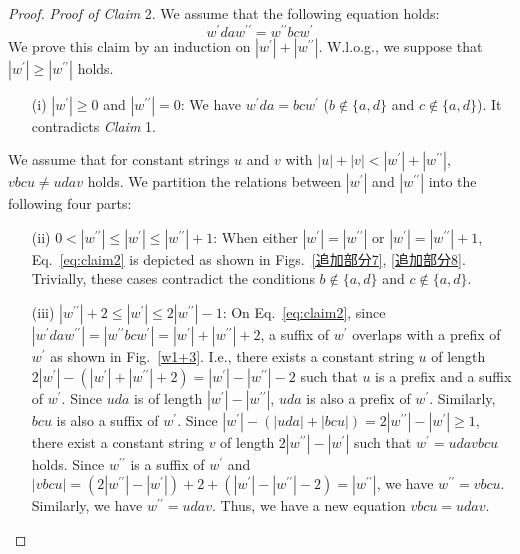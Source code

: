\begin{proof}
  \noindent
  \textit{Proof of Claim} 2.
  We assume that the following equation holds:
  \begin{equation}
  w^{\prime}daw^{\prime\prime} = w^{\prime\prime}bcw^{\prime}\label{eq:claim2}
  \end{equation}
  We prove this claim by an induction on $|w^{\prime}| + |w^{\prime\prime}|$.
  W.l.o.g., we suppose that $|w^{\prime}| \geq |w^{\prime\prime}|$ holds.
  \begin{enumerate}
    \item[(i)] $|w^{\prime}| \geq 0$ and $|w^{\prime\prime}|=0$:
    We have $w^{\prime}da = bcw^{\prime}$ ($b \not\in \{a,d\}$ and $c \not\in \{a,d\}$).
    It contradicts \textit{Claim} 1.
  \end{enumerate}
  We assume that for constant strings $u$ and $v$ with $|u| + |v| < |w^{\prime}| + |w^{\prime\prime}|$, $vbcu \not= udav$ holds.
  We partition the relations between $|w^{\prime}|$ and $|w^{\prime\prime}|$ into the following four parts:
  \begin{enumerate}
  \item[(ii)] $0 < |w^{\prime\prime}| \le |w^{\prime}| \le |w^{\prime\prime}|+1$:
  When either $|w^{\prime}|=|w^{\prime\prime}|$ or $|w^{\prime}|=|w^{\prime\prime}|+1$, Eq.~\ref{eq:claim2} is depicted as shown in Figs.~\ref{追加部分7}, \ref{追加部分8}. Trivially, these cases contradict the conditions $b \not\in \{a,d\}$ and $c \not\in \{a,d\}$.
  \item[(iii)] $|w^{\prime\prime}|+2 \le |w^{\prime}| \le 2|w^{\prime\prime}| - 1$:
  On Eq.~\ref{eq:claim2}, since $|w^{\prime}daw^{\prime\prime}| = |w^{\prime\prime}bcw^{\prime}| = |w^{\prime}| + |w^{\prime\prime}| + 2$, a suffix of $w^{\prime}$ overlaps with a prefix of $w^{\prime}$ as shown in Fig.~\ref{w1+3}. I.e., there exists a constant string $u$ of length $2|w^{\prime}| - (|w^{\prime}| + |w^{\prime\prime}| + 2) = |w^{\prime}| - |w^{\prime\prime}| - 2$ such that $u$ is a prefix and a suffix of $w^{\prime}$.
  Since $uda$ is of length $|w^{\prime}| - |w^{\prime\prime}|$, $uda$ is also a prefix of $w^{\prime}$. Similarly, $bcu$ is also a suffix of $w^{\prime}$.
  Since $|w^{\prime}| - (|uda| + |bcu|) = 2|w^{\prime\prime}| - |w^{\prime}| \ge 1$, there exist a constant string $v$ of length $2|w^{\prime\prime}| - |w^{\prime}|$ such that $w^{\prime} = udavbcu$ holds. Since $w^{\prime\prime}$ is a suffix of $w^{\prime}$ and $|vbcu| = (2|w^{\prime\prime}| - |w^{\prime}|) + 2 + (|w^{\prime}| - |w^{\prime\prime}| - 2) = |w^{\prime\prime}|$, we have $w^{\prime\prime} = vbcu$. Similarly, we have $w^{\prime\prime} = udav$. Thus, we have a new equation $vbcu = udav$.

\end{enumerate}
\end{proof}
